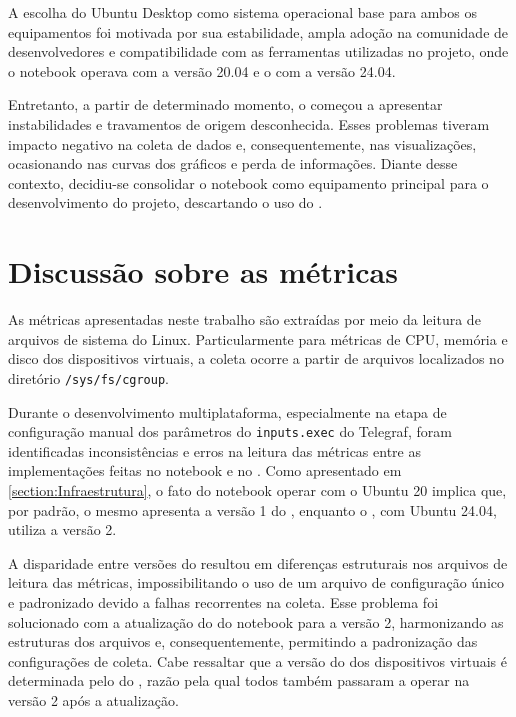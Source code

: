 A escolha do Ubuntu Desktop como sistema operacional base para ambos os equipamentos foi motivada por sua estabilidade, ampla adoção na comunidade de desenvolvedores e compatibilidade com as ferramentas utilizadas no projeto, onde o notebook operava com a versão 20.04 e o  com a versão 24.04.

Entretanto, a partir de determinado momento, o  começou a apresentar instabilidades e travamentos de origem desconhecida. Esses problemas tiveram impacto negativo na coleta de dados e, consequentemente, nas visualizações, ocasionando  nas curvas dos gráficos e perda de informações. Diante desse contexto, decidiu-se consolidar o notebook como equipamento principal para o desenvolvimento do projeto, descartando o uso do .



\section{Discussão sobre as métricas}
\label{section:DiscussaoMetricas}

As métricas apresentadas neste trabalho são extraídas por meio da leitura de arquivos de sistema do Linux. Particularmente para métricas de CPU, memória e disco dos dispositivos virtuais, a coleta ocorre a partir de arquivos localizados no diretório \verb|/sys/fs/cgroup|.

Durante o desenvolvimento multiplataforma, especialmente na etapa de configuração manual dos parâmetros do \verb|inputs.exec| do Telegraf, foram identificadas inconsistências e erros na leitura das métricas entre as implementações feitas no notebook e no . Como apresentado em \ref{section:Infraestrutura}, o fato do notebook operar com o Ubuntu 20 implica que, por padrão, o mesmo apresenta a versão 1 do , enquanto o , com Ubuntu 24.04, utiliza a versão 2.

A disparidade entre versões do  resultou em diferenças estruturais nos arquivos de leitura das métricas, impossibilitando o uso de um arquivo de configuração único e padronizado devido a falhas recorrentes na coleta. Esse problema foi solucionado com a atualização do  do notebook para a versão 2, harmonizando as estruturas dos arquivos e, consequentemente, permitindo a padronização das configurações de coleta. Cabe ressaltar que a versão do  dos dispositivos virtuais é determinada pelo  do , razão pela qual todos também passaram a operar na versão 2 após a atualização.

